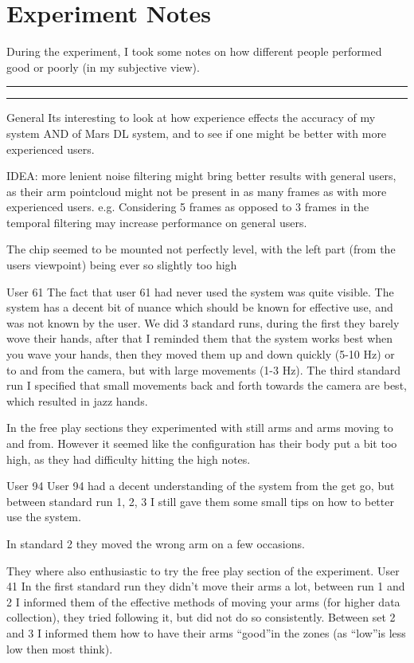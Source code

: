 \chapter{Experiment Notes}
\label{appendix: experiment notes}

During the experiment, I took some notes on how different people performed good or poorly (in my subjective view).

\vspace{2em}
\hrule
\vspace{0.2em}
\hrule

General
Its interesting to look at how experience effects the accuracy of my system AND of Mars DL system, and to see if one might be better with more experienced users.

IDEA: more lenient noise filtering might bring better results with general users, as their arm pointcloud might not be present in as many frames as with more experienced users. 
e.g. Considering 5 frames as opposed to 3 frames in the temporal filtering may increase performance on general users.

The chip seemed to be mounted not perfectly level, with the left part (from the users viewpoint) being ever so slightly too high

User 61
The fact that user 61 had never used the system was quite visible. 
The system has a decent bit of nuance which should be known for effective use, and was not known by the user.
We did 3 standard runs, during the first they barely wove their hands, after that I reminded them that the system works best when you wave your hands, then they moved them up and down quickly (5-10 Hz) or to and from the camera, but with large movements (1-3 Hz).
The third standard run I specified that small movements back and forth towards the camera are best, which resulted in jazz hands.

In the free play sections they experimented with still arms and arms moving to and from. However it seemed like the configuration has their body put a bit too high, as they had difficulty hitting the high notes.

User 94
User 94 had a decent understanding of the system from the get go, but between standard run 1, 2, 3 I still gave them some small tips on how to better use the system.

In standard 2 they moved the wrong arm on a few occasions.


They where also enthusiastic to try the free play section of the experiment.
User 41
In the first standard run they didn’t move their arms a lot, between run 1 and 2 I informed them of the effective methods of moving your arms (for higher data collection), they tried following it, but did not do so consistently.
Between set 2 and 3 I informed them how to have their arms “good”in the zones (as “low”is less low then most think).


